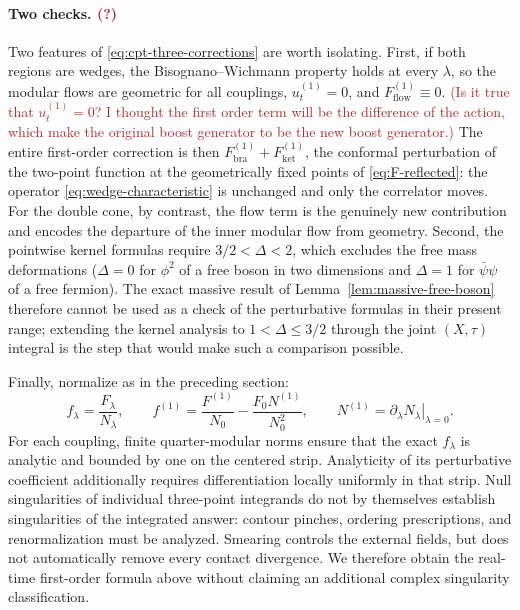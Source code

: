 \documentclass[a4paper,11pt]{article}
\theoremstyle{definition}
\newcommand{\KL}[1]{\textcolor{brown}{#1}}
\begin{document}
\paragraph{Two checks. \KL{(?)}}
Two features of \eqref{eq:cpt-three-corrections} are worth isolating. First, if both regions are wedges, the Bisognano--Wichmann property holds at every $\lambda$, so the modular flows are geometric for all couplings, $u^{(1)}_t=0$, and $F^{(1)}_{\mathrm{flow}}\equiv0$. \KL{(Is it true that $u^{(1)}_t=0$? I thought the first order term will be the difference of the action, which make the original boost generator to be the new boost generator.)} The entire first-order correction is then $F^{(1)}_{\mathrm{bra}}+F^{(1)}_{\mathrm{ket}}$, the conformal perturbation of the two-point function at the geometrically fixed points of \eqref{eq:F-reflected}: the operator \eqref{eq:wedge-characteristic} is unchanged and only the correlator moves. For the double cone, by contrast, the flow term is the genuinely new contribution and encodes the departure of the inner modular flow from geometry. Second, the pointwise kernel formulas require $3/2<\Delta<2$, which excludes the free mass deformations ($\Delta=0$ for $\phi^2$ of a free boson in two dimensions and $\Delta=1$ for $\bar\psi\psi$ of a free fermion). The exact massive result of Lemma~\ref{lem:massive-free-boson} therefore cannot be used as a check of the perturbative formulas in their present range; extending the kernel analysis to $1<\Delta\le3/2$ through the joint $(X,\tau)$ integral is the step that would make such a comparison possible.

Finally, normalize as in the preceding section:
\begin{equation}
 f_\lambda=\frac{F_\lambda}{N_\lambda},
 \qquad f^{(1)}=\frac{F^{(1)}}{N_0}-\frac{F_0N^{(1)}}{N_0^2},
 \qquad N^{(1)}=\left.\partial_\lambda N_\lambda\right|_{\lambda=0}.
 \label{eq:cpt-normalized-correction}
\end{equation}
For each coupling, finite quarter-modular norms ensure that the exact $f_\lambda$ is analytic and bounded by one on the centered strip. Analyticity of its perturbative coefficient additionally requires differentiation locally uniformly in that strip. Null singularities of individual three-point integrands do not by themselves establish singularities of the integrated answer: contour pinches, ordering prescriptions, and renormalization must be analyzed. Smearing controls the external fields, but does not automatically remove every contact divergence. We therefore obtain the real-time first-order formula above without claiming an additional complex singularity classification.
\end{document}
